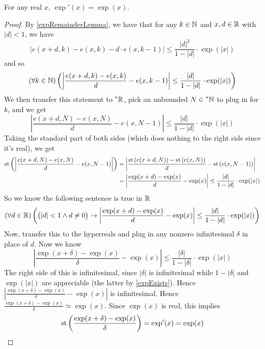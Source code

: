 \begin{thm}
    For any real $x$, $\exp'(x) = \exp(x)$.
\end{thm}

\begin{proof}
    By \ref{expRemainderLemma}, we have that for any $k \in \mathbb{N}$ and $x, d \in \mathbb{R}$ with $|d| < 1$, we have
    \[ |e(x + d, k) - e(x, k) - d\cdot e(x, k-1)| \leq \frac{|d|^2}{1 - |d|} \cdot \exp(|x|) \]
    and so
    \[(\forall k \in \mathbb{N})\left(\left|\frac{e(x + d, k) - e(x, k)}{d} - e(x, k - 1)\right| \leq \frac{|d|}{1 - |d|} \cdot \exp(|x|)\right)\]
    We then transfer this statement to $\prescript{*}{}{\mathbb{R}}$, pick an unbounded $N \in \prescript{*}{}{\mathbb{N}}$ to plug in for $k$, and we get
    \[\left|\frac{e(x + d, N) - e(x, N)}{d} - e(x, N - 1)\right| \leq \frac{|d|}{1-|d|} \cdot \exp(|x|)\]
    Taking the standard part of both sides (which does nothing to the right side since it's real), we get
    \begin{align*}
    \operatorname{st}\left(\left|\frac{e(x + d, N) - e(x, N)}{d} - e(x, N - 1)\right|\right) &= \left|\frac{\operatorname{st}\left(e(x + d, N)\right) - \operatorname{st}\left(e(x, N)\right)}{d} - \operatorname{st}\left(e(x, N - 1)\right)\right| \\
        &= \left|\frac{\exp(x + d) - \exp(x)}{d} - \exp(x)\right| \leq \frac{|d|}{1-|d|} \cdot \exp(|x|)
    \end{align*}
    So we know the following sentence is true in $\mathbb{R}$
    \[(\forall d \in \mathbb{R})\left(\big(|d| < 1 \land d \neq 0\big) \to \left|\frac{\exp(x + d) - \exp(x)}{d} - \exp(x)\right| \leq \frac{|d|}{1-|d|} \cdot \exp(|x|)\right)\]
    Now, transfer this to the hyperreals and plug in any nonzero infinitesimal $\delta$ in place of $d$. Now we know
    \[\left|\frac{\exp(x + \delta) - \exp(x)}{\delta} - \exp(x)\right| \leq \frac{|\delta|}{1-|\delta|} \cdot \exp(|x|)\]
    The right side of this is infinitesimal, since $|\delta|$ is infinitesimal while $1 - |\delta|$ and $\exp(|x|)$ are appreciable (the latter by \ref{expExists}). Hence $\left|\frac{\exp(x + \delta) - \exp(x)}{\delta} - \exp(x)\right|$ is infinitesimal. Hence $\frac{\exp(x + \delta) - \exp(x)}{\delta} \simeq \exp(x)$. Since $\exp(x)$ is real, this implies
    \[\operatorname{st}\left(\frac{\exp(x + \delta) - \exp(x)}{\delta}\right) = \exp'(x) = \exp(x)\]
\end{proof}